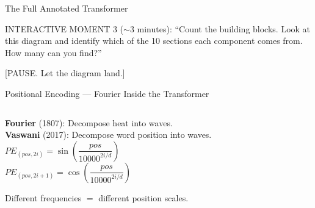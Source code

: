\documentclass[aspectratio=169,12pt]{beamer}
\begin{document}
\begin{frame}{The Full Annotated Transformer}
{    INTERACTIVE MOMENT 3 ($\sim$3 minutes): ``Count the building blocks.
    Look at this diagram and identify which of the 10 sections each component
    comes from. How many can you find?''

    [PAUSE. Let the diagram land.]
  }
\end{frame}


\begin{frame}{Positional Encoding --- Fourier Inside the Transformer}

  \begin{columns}[T]
    \begin{column}{0.52\textwidth}
      \begin{tcolorbox}[colback=approxGreen!5, colframe=approxGreen,
        fonttitle=\bfseries\small,
        title={Same Math, 210 Years Apart},
        rounded corners, boxrule=0.8pt, left=3pt, right=3pt, top=2pt, bottom=2pt]
        \small
        \textbf{Fourier} (1807): Decompose heat into waves.\\[4pt]
        \textbf{Vaswani} (2017): Decompose word position into waves.\\[6pt]
        $PE_{(pos,2i)} = \sin\!\left(\dfrac{pos}{10000^{2i/d}}\right)$\\[6pt]
        $PE_{(pos,2i+1)} = \cos\!\left(\dfrac{pos}{10000^{2i/d}}\right)$
      \end{tcolorbox}

      \vspace{0.2em}

      {\scriptsize\centering Different frequencies $=$ different position scales.\par}
    \end{column}


\end{columns}
\end{frame}
\end{document}
